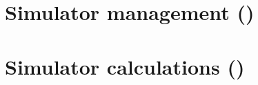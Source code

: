 \subsection{ }

\subsection{ }

\section{Simulator management ()}


\subsection{ }

\subsection{ }

\subsection{ }

\subsection{ }

\subsection{ }

\subsection{ }

\subsection{ }

\subsection{ }

\section{Simulator calculations ()}


\subsection{ }
